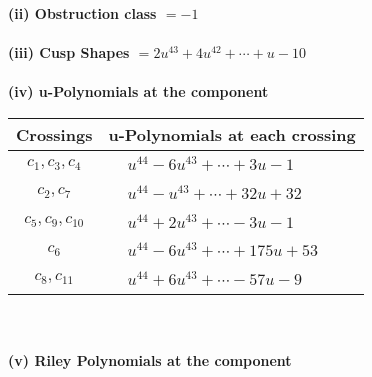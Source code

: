 \documentclass[1p]{elsarticle_modified}
\theoremstyle{definition}
\begin{document}
\flushleft \textbf{(ii) Obstruction class $= -1$}\\~\\
\flushleft \textbf{(iii) Cusp Shapes $= 2 u^{43}+4 u^{42}+\cdots+u-10$}\\~\\
\newpage\renewcommand{\arraystretch}{1}
\flushleft \textbf{(iv) u-Polynomials at the component}\newline \\
\begin{tabular}{m{50pt}|m{274pt}}
Crossings & \hspace{64pt}u-Polynomials at each crossing \\
\hline $$\begin{aligned}c_{1},c_{3},c_{4}\end{aligned}$$&$\begin{aligned}
&u^{44}-6 u^{43}+\cdots+3 u-1
\end{aligned}$\\
\hline $$\begin{aligned}c_{2},c_{7}\end{aligned}$$&$\begin{aligned}
&u^{44}- u^{43}+\cdots+32 u+32
\end{aligned}$\\
\hline $$\begin{aligned}c_{5},c_{9},c_{10}\end{aligned}$$&$\begin{aligned}
&u^{44}+2 u^{43}+\cdots-3 u-1
\end{aligned}$\\
\hline $$\begin{aligned}c_{6}\end{aligned}$$&$\begin{aligned}
&u^{44}-6 u^{43}+\cdots+175 u+53
\end{aligned}$\\
\hline $$\begin{aligned}c_{8},c_{11}\end{aligned}$$&$\begin{aligned}
&u^{44}+6 u^{43}+\cdots-57 u-9
\end{aligned}$\\
\hline
\end{tabular}\\~\\
\newpage\renewcommand{\arraystretch}{1}
\flushleft \textbf{(v) Riley Polynomials at the component}\newline \\
\end{document}
